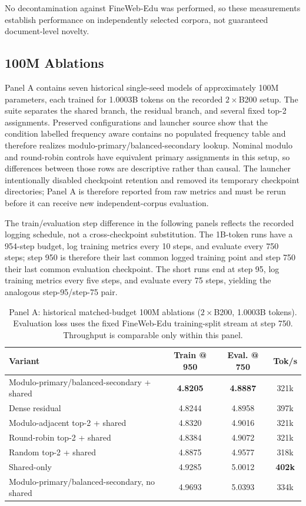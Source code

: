 \documentclass[10pt]{article}
\theoremstyle{definition}
\theoremstyle{remark}
\begin{document}
No decontamination against FineWeb-Edu was performed, so these measurements establish performance on independently selected corpora, not guaranteed document-level novelty.

\FloatBarrier

\subsection{100M Ablations}
\label{sec:ablation_100m}

Panel A contains seven historical single-seed models of approximately 100M parameters, each trained for 1.0003B tokens on the recorded $2\times$B200 setup. The suite separates the shared branch, the residual branch, and several fixed top-2 assignments. Preserved configurations and launcher source show that the condition labelled frequency aware contains no populated frequency table and therefore realizes modulo-primary/balanced-secondary lookup. Nominal modulo and round-robin controls have equivalent primary assignments in this setup, so differences between those rows are descriptive rather than causal. The launcher intentionally disabled checkpoint retention and removed its temporary checkpoint directories; Panel A is therefore reported from raw metrics and must be rerun before it can receive new independent-corpus evaluation.

The train/evaluation step difference in the following panels reflects the recorded logging schedule, not a cross-checkpoint substitution. The 1B-token runs have a 954-step budget, log training metrics every 10 steps, and evaluate every 750 steps; step 950 is therefore their last common logged training point and step 750 their last common evaluation checkpoint. The short runs end at step 95, log training metrics every five steps, and evaluate every 75 steps, yielding the analogous step-95/step-75 pair.

\begin{table}[H]
\centering
\small
\caption{Panel A: historical matched-budget 100M ablations ($2\times$B200, 1.0003B tokens). Evaluation loss uses the fixed FineWeb-Edu training-split stream at step 750. Throughput is comparable only within this panel.}
\label{tab:100m_ablation}
\begin{tabular}{lccc}
\toprule
\textbf{Variant} & \textbf{Train @ 950} & \textbf{Eval. @ 750} & \textbf{Tok/s} \\
\midrule
Modulo-primary/balanced-secondary + shared & \textbf{4.8205} & \textbf{4.8887} & 321k \\
Dense residual & 4.8244 & 4.8958 & 397k \\
Modulo-adjacent top-2 + shared & 4.8320 & 4.9016 & 321k \\
Round-robin top-2 + shared & 4.8384 & 4.9072 & 321k \\
Random top-2 + shared & 4.8875 & 4.9577 & 318k \\
Shared-only & 4.9285 & 5.0012 & \textbf{402k} \\
Modulo-primary/balanced-secondary, no shared & 4.9693 & 5.0393 & 334k \\
\bottomrule
\end{tabular}
\end{table}
\end{document}
